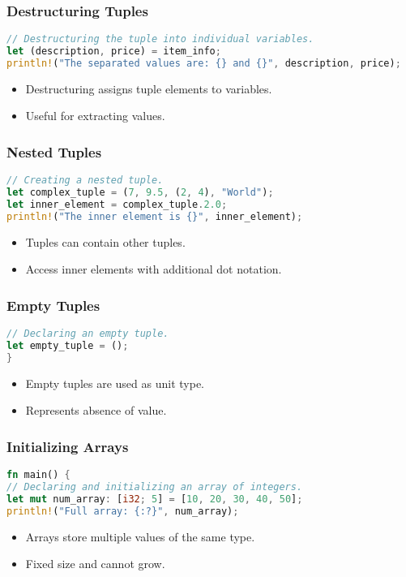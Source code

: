 \documentclass[aspectratio=169, table]{beamer}
\begin{document}
\begin{frame}[fragile]
\frametitle{Destructuring Tuples}
\begin{lstlisting}[language=Rust]
// Destructuring the tuple into individual variables.
let (description, price) = item_info;
println!("The separated values are: {} and {}", description, price);
\end{lstlisting}
\begin{itemize}
\item Destructuring assigns tuple elements to variables.
\item Useful for extracting values.
\end{itemize}
\end{frame}

\begin{frame}[fragile]
\frametitle{Nested Tuples}
\begin{lstlisting}[language=Rust]
// Creating a nested tuple.
let complex_tuple = (7, 9.5, (2, 4), "World");
let inner_element = complex_tuple.2.0;
println!("The inner element is {}", inner_element);
\end{lstlisting}
\begin{itemize}
\item Tuples can contain other tuples.
\item Access inner elements with additional dot notation.
\end{itemize}
\end{frame}

\begin{frame}[fragile]
\frametitle{Empty Tuples}
\begin{lstlisting}[language=Rust]
// Declaring an empty tuple.
let empty_tuple = ();
}
\end{lstlisting}
\begin{itemize}
\item Empty tuples are used as unit type.
\item Represents absence of value.
\end{itemize}
\end{frame}

\begin{frame}[fragile]
\frametitle{Initializing Arrays}
\begin{lstlisting}[language=Rust]
fn main() {
// Declaring and initializing an array of integers.
let mut num_array: [i32; 5] = [10, 20, 30, 40, 50];
println!("Full array: {:?}", num_array);
\end{lstlisting}
\begin{itemize}
\item Arrays store multiple values of the same type.
\item Fixed size and cannot grow.
\end{itemize}
\end{frame}
\end{document}
